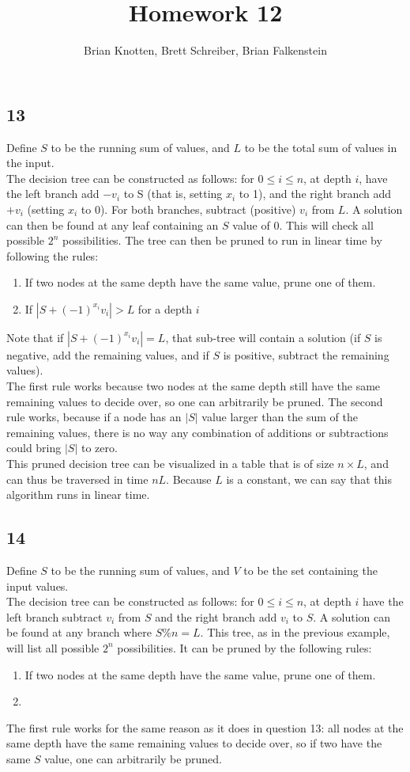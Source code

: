 \documentclass[letterpaper,notitlepage,twoside]{article}
\begin{document}
\title{Homework 12}
\author{Brian Knotten, Brett Schreiber, Brian Falkenstein}
\maketitle

\subsection*{13}
Define $S$ to be the running sum of values, and $L$ to be the total sum of values in the input.\\
The decision tree can be constructed as follows: for $0\leq i \leq n$, at depth $i$, have the left branch add $-v_i$ to S (that is, setting $x_i$ to 1), and the right branch add $+v_i$ (setting $x_i$ to 0). For both branches, subtract (positive) $v_i$ from $L$. A solution can then be found at any leaf containing an $S$ value of 0. This will check all possible $2^n$ possibilities. The tree can then be pruned to run in linear time by following the rules: 
\begin{enumerate}
\item If two nodes at the same depth have the same value, prune one of them. 
\item If $|S+(-1)^{x_i} v_i| > L$ for a depth $i$ 
\end{enumerate}
Note that if $|S+(-1)^{x_i} v_i| = L$, that sub-tree will contain a solution (if $S$ is negative, add the remaining values, and if $S$ is positive, subtract the remaining values). \\
The first rule works because two nodes at the same depth still have the same remaining values to decide over, so one can arbitrarily be pruned. The second rule works, because if a node has an $|S|$ value larger than the sum of the remaining values, there is no way any combination of additions or subtractions could bring $|S|$ to zero. \\
This pruned decision tree can be visualized in a table that is of size $n\times L$, and can thus be traversed in time $nL$. Because $L$ is a constant, we can say that this algorithm runs in linear time. 

\subsection*{14}
Define $S$ to be the running sum of values, and $V$ to be the set containing the input values. \\
The decision tree can be constructed as follows: for $0\leq i \leq n$, at depth $i$ have the left branch subtract $v_i$ from $S$ and the right branch add $v_i$ to $S$. A solution can be found at any branch where $S\% n = L$. This tree, as in the previous example, will list all possible $2^n$ possibilities. It can be pruned by the following rules:   
\begin{enumerate}
\item If two nodes at the same depth have the same value, prune one of them. 
\item
\end{enumerate}
The first rule works for the same reason as it does in question 13: all nodes at the same depth have the same remaining values to decide over, so if two have the same $S$ value, one can arbitrarily be pruned. 
\end{document}
